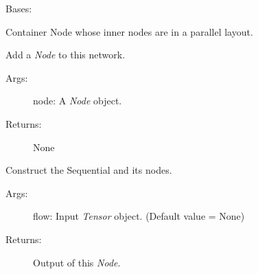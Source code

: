 \documentclass[letterpaper,10pt,english]{sphinxmanual}
\begin{document}
\begin{fulllineitems}
\label{legonet:legonet.topology.Parallel}
Bases: {\hyperref[legonet:legonet.topology.Node]{\emph{}}}

Container Node whose inner nodes are in a parallel layout.

\begin{fulllineitems}
\label{legonet:legonet.topology.Parallel.add}
Add a \emph{Node} to this network.
\begin{description}
\item[{Args:}] \leavevmode
node: A \emph{Node} object.

\item[{Returns:}] \leavevmode
None

\end{description}

\end{fulllineitems}


\begin{fulllineitems}
\label{legonet:legonet.topology.Parallel.call}
Construct the Sequential and its nodes.
\begin{description}
\item[{Args:}] \leavevmode
flow: Input \emph{Tensor} object. (Default value = None)

\item[{Returns:}] \leavevmode
Output of this \emph{Node}.

\end{description}

\end{fulllineitems}


\end{fulllineitems}

\end{document}
